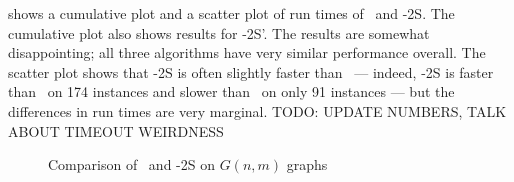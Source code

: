  shows a cumulative plot and a scatter plot of run times of \McSplit\ and \McSplit-2S.
The cumulative plot also shows results for \McSplit-2S'.  The results are somewhat disappointing; all three algorithms
have very similar performance overall.  The scatter plot shows that \McSplit-2S is often slightly faster than \McSplit\ --- indeed,
\McSplit-2S is faster than \McSplit\ on 174 instances and slower than \McSplit\ on only 91 instances --- but the differences
in run times are very marginal.  TODO: UPDATE NUMBERS, TALK ABOUT TIMEOUT WEIRDNESS

\begin{figure}[htb]
    \centering
    \caption{Comparison of \McSplit\ and \McSplit-2S on $G(n,m)$ graphs}
    \label{figure:mcsplit-vs-mcsplit2-gnm}
\end{figure}

